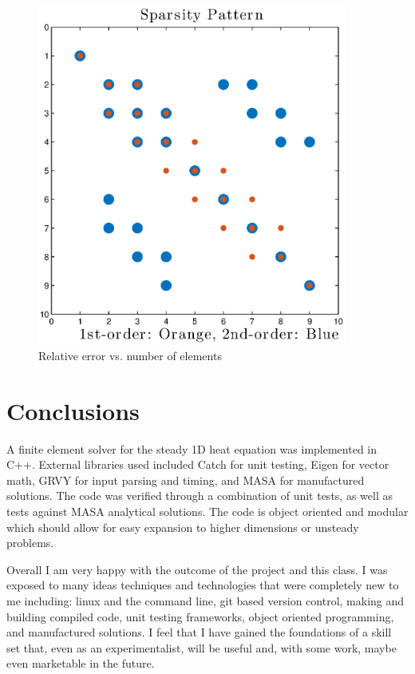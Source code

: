 \documentclass[12pt]{article}
\begin{document}
\begin{figure}[!htbp] %
   \centering
   \includegraphics[width=4in]{sparsity.eps} 
   \caption{Relative error vs. number of elements}
   \label{fig:sparsity}
\end{figure}

\section*{Conclusions}

A finite element solver for the steady 1D heat equation was implemented in C++.  External libraries used included Catch for unit testing, Eigen for vector math, GRVY for input parsing and timing, and MASA for manufactured solutions.  The code was verified through a combination of unit tests, as well as tests against MASA analytical solutions.  The code is object oriented and modular which should allow for easy expansion to higher dimensions or unsteady problems.

Overall I am very happy with the outcome of the project and this class.  I was exposed to many ideas techniques and technologies that were completely new to me including: linux and the command line, git based version control, making and building compiled code, unit testing frameworks, object oriented programming, and manufactured solutions.  I feel that I have gained the foundations of a skill set that, even as an experimentalist, will be useful and, with some work, maybe even marketable in the future.



 
\end{document}
